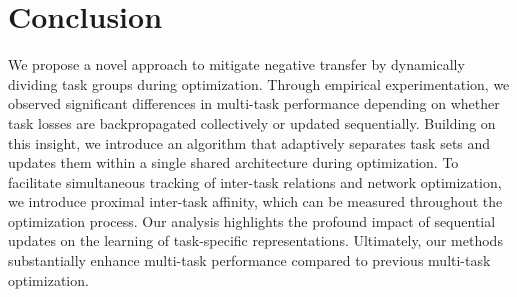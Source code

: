 \section{Conclusion}
We propose a novel approach to mitigate negative transfer by dynamically dividing task groups during optimization. Through empirical experimentation, we observed significant differences in multi-task performance depending on whether task losses are backpropagated collectively or updated sequentially. Building on this insight, we introduce an algorithm that adaptively separates task sets and updates them within a single shared architecture during optimization. To facilitate simultaneous tracking of inter-task relations and network optimization, we introduce proximal inter-task affinity, which can be measured throughout the optimization process. Our analysis highlights the profound impact of sequential updates on the learning of task-specific representations. Ultimately, our methods substantially enhance multi-task performance compared to previous multi-task optimization.